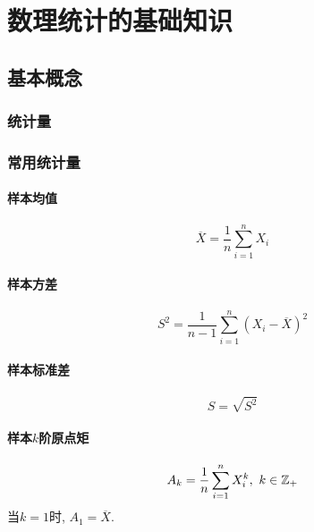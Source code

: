 \chapter{数理统计的基础知识}
\section{基本概念}
\subsection{统计量}
\subsection{常用统计量}
\subsubsection{样本均值}
\begin{equation}
    \overline{X} = \frac{1}{n}\sum_{i=1}^n X_i
\end{equation}
\subsubsection{样本方差}
\begin{equation}
    S^2 = \frac{1}{n-1}\sum_{i=1}^n \left( X_i - \overline{X} \right)^2
\end{equation}
\subsubsection{样本标准差}
\begin{equation}
    S = \sqrt{S^2}
\end{equation}
\subsubsection{样本$k$阶原点矩}
\begin{equation}
    A_k = \frac{1}{n}\sum_{i=1}^n X_i^k,\,\,k\in \ZZ_+
\end{equation}
当$k=1$时, $A_1 = \overline{X}$.
